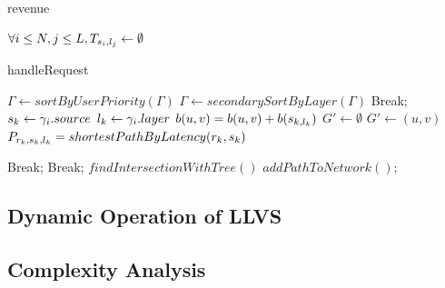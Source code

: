 \documentclass[a4paper, 10pt, conference]{ieeeconf}
\DeclarePairedDelimiter\abs{\lvert}{\rvert}%
\begin{document}
\begin{algorithm}
    \caption{revenue}\label{alg:revenue}
    \begin{algorithmic}[1]
        \State $\forall i \le N, j \le L, T_{s_i,l_j} \gets \emptyset$
    \EndProcedure
    \end{algorithmic}
\end{algorithm}

\begin{algorithm}
    \caption{handleRequest}\label{alg:handleRequest}
    \begin{algorithmic}[1]
        \State $\Gamma \gets sortByUserPriority(\Gamma)$
        \State $\Gamma \gets secondarySortByLayer(\Gamma)$
            Break; 
            \EndIf
            \State $s_k\gets\gamma_i.source$ 
            \State $l_k\gets\gamma_i.layer$ 
                \State $b(u,v) = b(u,v) + b(s_{k,l_k})$
            \EndFor
            \State $G' \gets \emptyset$
                    \State $G' \gets (u,v) $
                \EndIf
            \EndFor
            \State $P_{r_k,s_k,l_k} = shortestPathByLatency(r_k ,s_k)$
            
             Break; \EndIf
             
                \State Break; 
                \EndIf
            \EndIf
            \State $findIntersectionWithTree()$
            \State $addPathToNetwork();$
        \EndFor
    \EndProcedure
    \end{algorithmic}
\end{algorithm}

\subsection{Dynamic Operation of LLVS}
\subsection{Complexity Analysis}
\end{document}

